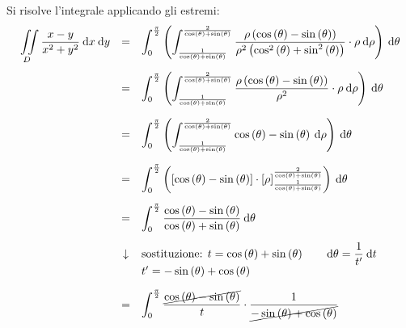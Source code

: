 \documentclass[a4paper]{article}
\begin{document}
	\noindent
	Si risolve l'integrale applicando gli estremi:
	\begin{equation*}
		\begin{array}{rcl}
			\displaystyle\iint\limits_{D} \dfrac{x-y}{x^{2}+y^{2}} \:\mathrm{d}x\:\mathrm{d}y
			&=&
			\displaystyle\int_{0}^{\frac{\pi}{2}} \left(\int_{\frac{1}{\cos\left(\theta\right) + \sin\left(\theta\right)}}^{\frac{2}{\cos\left(\theta\right) + \sin\left(\theta\right)}} \dfrac{\rho\left(\cos\left(\theta\right) - \sin\left(\theta\right)\right)}{\rho^{2}\left(\cos^{2}\left(\theta\right) + \sin^{2}\left(\theta\right)\right)} \cdot \rho \:\mathrm{d}\rho\right) \:\mathrm{d}\theta \\ [2em]
			&=&
			\displaystyle\int_{0}^{\frac{\pi}{2}}\left(
				\displaystyle\int_{\frac{1}{\cos\left(\theta\right) + \sin\left(\theta\right)}}^{\frac{2}{\cos\left(\theta\right) + \sin\left(\theta\right)}}
					\dfrac{\rho\left(\cos\left(\theta\right) - \sin\left(\theta\right)\right)}{\rho^{2}} \cdot \rho
				\:\mathrm{d}\rho
			\right)\:\mathrm{d}\theta \\ [2em]
			&=&
			\displaystyle\int_{0}^{\frac{\pi}{2}}\left(
				\displaystyle\int_{\frac{1}{\cos\left(\theta\right) + \sin\left(\theta\right)}}^{\frac{2}{\cos\left(\theta\right) + \sin\left(\theta\right)}}
					\cos\left(\theta\right) - \sin\left(\theta\right)
				\:\mathrm{d}\rho
			\right)\:\mathrm{d}\theta \\ [2em]
			&=&
			\displaystyle\int_{0}^{\frac{\pi}{2}}\left(
				\left[\cos\left(\theta\right) - \sin\left(\theta\right)\right] \cdot \left[\rho\right]_{\frac{1}{\cos\left(\theta\right) + \sin\left(\theta\right)}}^{\frac{2}{\cos\left(\theta\right) + \sin\left(\theta\right)}}
			\right)\:\mathrm{d}\theta \\ [1.5em]
			&=&
			\displaystyle\int_{0}^{\frac{\pi}{2}}
				\dfrac{\cos\left(\theta\right) - \sin\left(\theta\right)}{\cos\left(\theta\right) + \sin\left(\theta\right)}
			\:\mathrm{d}\theta \\ [1.5em]
			&\downarrow& \text{sostituzione: } t = \cos\left(\theta\right) + \sin\left(\theta\right) \hspace{2em} \mathrm{d}\theta = \dfrac{1}{t'} \:\mathrm{d}t \hspace{2em} \\
			&& t' = -\sin\left(\theta\right) + \cos\left(\theta\right) \\ [1em]
			&=&
			\displaystyle\int_{0}^{\frac{\pi}{2}}
				\dfrac{\cancel{\cos\left(\theta\right) - \sin\left(\theta\right)}}{t} \cdot \dfrac{1}{\cancel{-\sin\left(\theta\right) + \cos\left(\theta\right)}}

\end{array}
\end{equation*}
\end{document}
